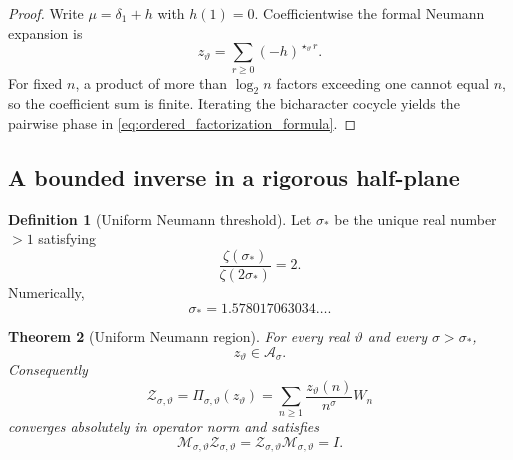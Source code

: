 \documentclass[11pt]{amsart}
\numberwithin{equation}{section}
\theoremstyle{plain}
\newtheorem{theorem}{Theorem}[section]
\theoremstyle{definition}
\newtheorem{definition}[theorem]{Definition}
\theoremstyle{remark}
\newcommand{\deltaone}{\delta_{1}}
\begin{document}
\begin{proof}
Write \(\mu=\deltaone+h\) with \(h(1)=0\).  Coefficientwise the formal
Neumann expansion is
\begin{equation}
z_\vartheta
=
\sum_{r\ge0}(-h)^{\star_\vartheta r}.
\label{eq:formal_neumann_coefficientwise}
\end{equation}
For fixed \(n\), a product of more than \(\log_2 n\) factors exceeding
one cannot equal \(n\), so the coefficient sum is finite.  Iterating the
bicharacter cocycle yields the pairwise phase in
\eqref{eq:ordered_factorization_formula}.
\end{proof}

\subsection{A bounded inverse in a rigorous half-plane}
\label{subsec:bounded_inverse}

\begin{definition}[Uniform Neumann threshold]
\label{def:neumann_threshold}
Let \(\sigma_*\) be the unique real number \(>1\) satisfying
\begin{equation}
\frac{\zeta(\sigma_*)}{\zeta(2\sigma_*)}=2.
\label{eq:neumann_threshold_equation}
\end{equation}
Numerically,
\begin{equation}
\sigma_*=1.578017063034\ldots.
\label{eq:neumann_threshold_numeric}
\end{equation}
\end{definition}

\begin{theorem}[Uniform Neumann region]
\label{thm:neumann_region}
For every real \(\vartheta\) and every \(\sigma>\sigma_*\),
\begin{equation}
z_\vartheta\in\mathcal A_\sigma.
\label{eq:ztheta_in_Asigma}
\end{equation}
Consequently
\begin{equation}
\mathcal Z_{\sigma,\vartheta}
=
\Pi_{\sigma,\vartheta}(z_\vartheta)
=
\sum_{n\ge1}
\frac{z_\vartheta(n)}{n^\sigma}W_n
\label{eq:zeta_operator_deformed}
\end{equation}
converges absolutely in operator norm and satisfies
\begin{equation}
\mathcal M_{\sigma,\vartheta}
\mathcal Z_{\sigma,\vartheta}
=
\mathcal Z_{\sigma,\vartheta}
\mathcal M_{\sigma,\vartheta}
=I.
\label{eq:operator_inverse_identity}
\end{equation}
\end{theorem}
\end{document}
